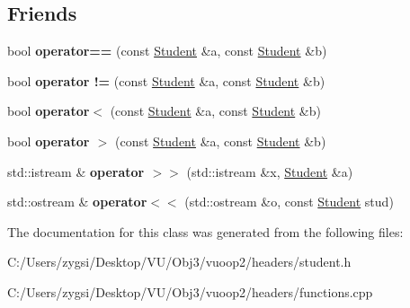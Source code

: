 \subsection*{Friends}
\begin{DoxyCompactItemize}
\item 
\mbox{\label{class_student_a3964d3cf585d930b3e6c9eb6379ba41f}} 
bool {\bfseries operator==} (const \mbox{\hyperlink{class_student}{Student}} \&a, const \mbox{\hyperlink{class_student}{Student}} \&b)
\item 
\mbox{\label{class_student_ad8cfd945b2043c31f0c44f9d27ee126c}} 
bool {\bfseries operator !=} (const \mbox{\hyperlink{class_student}{Student}} \&a, const \mbox{\hyperlink{class_student}{Student}} \&b)
\item 
\mbox{\label{class_student_ae65f7355c5b9e95117aaf9bc93660ce9}} 
bool {\bfseries operator$<$} (const \mbox{\hyperlink{class_student}{Student}} \&a, const \mbox{\hyperlink{class_student}{Student}} \&b)
\item 
\mbox{\label{class_student_a963ae53da1e316f18939c182c43b0476}} 
bool {\bfseries operator $>$} (const \mbox{\hyperlink{class_student}{Student}} \&a, const \mbox{\hyperlink{class_student}{Student}} \&b)
\item 
\mbox{\label{class_student_a2dc455c716f701d603fdd2485304493e}} 
std\+::istream \& {\bfseries operator $>$$>$} (std\+::istream \&x, \mbox{\hyperlink{class_student}{Student}} \&a)
\item 
\mbox{\label{class_student_a0385ff34896a07109210e9ca09156e15}} 
std\+::ostream \& {\bfseries operator$<$$<$} (std\+::ostream \&o, const \mbox{\hyperlink{class_student}{Student}} stud)
\end{DoxyCompactItemize}


The documentation for this class was generated from the following files\+:\begin{DoxyCompactItemize}
\item 
C\+:/\+Users/zygsi/\+Desktop/\+V\+U/\+Obj3/vuoop2/headers/student.\+h\item 
C\+:/\+Users/zygsi/\+Desktop/\+V\+U/\+Obj3/vuoop2/headers/functions.\+cpp\end{DoxyCompactItemize}
